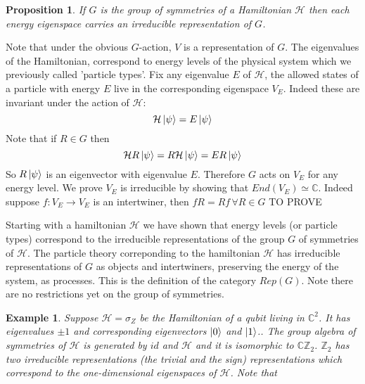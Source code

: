 \documentclass{article}
\newtheorem{example}{Example}
\newtheorem{proposition}[theorem]{Proposition}
\newenvironment{proof}[1][Proof]{\begin{trivlist}
\item[\hskip \labelsep {\bfseries #1}]}{\end{trivlist}}
\newcommand{\ham}{\mathcal{H}}
\begin{document}
\begin{proposition}
If $G$ is the group of symmetries of a Hamiltonian $\mathcal{H}$ then each energy eigenspace carries an irreducible representation of $G$.
\end{proposition}
\begin{proof}
Note that under the obvious $G$-action, $V$ is a representation of $G$. 
The eigenvalues of the Hamiltonian, correspond to energy levels of the physical system which we previously called 'particle types'. Fix any eigenvalue $E$ of $\ham$, the allowed states of a particle with energy $E$ live in the corresponding eigenspace $V_E$. Indeed these are invariant under the action of $\ham$:
$$ \ham \ket{\psi}= E\ket{\psi}$$
Note that if $R\in G$ then
$$ \ham R \ket{\psi}=R\ham \ket{\psi}=ER\ket{\psi}$$
So $R\ket{\psi}$ is an eigenvector with eigenvalue $E$. Therefore $G$ acts on $V_E$ for any energy level.
We prove $V_E$ is irreducible by showing that $End(V_E) \simeq \mathbb{C}$. Indeed suppose $f:V_E \rightarrow V_E$ is an intertwiner, then $fR=Rf \, \forall R \in G$
TO PROVE
\end{proof}
Starting with a hamiltonian $\ham$ we have shown that energy levels (or particle types) correspond to the irreducible representations of the group $G$ of symmetries of $\ham$. The particle theory correponding to the hamiltonian $\ham$ has irreducible representations of $G$ as objects and intertwiners, preserving the energy of the system, as processes. This is the definition of the category $Rep(G)$. Note there are no restrictions yet on the group of symmetries.
\begin{example}
Suppose $\ham = \sigma_Z$ be the Hamiltonian of a qubit living in $\mathbb{C}^2$. It has eigenvalues $\pm1$ and corresponding eigenvectors $\ket{0}$ and $\ket{1}$.. The group algebra of symmetries of $\ham$ is generated by $id$ and $\ham$ and it is isomorphic to $\mathbb{C}\mathbb{Z}_2$. $\mathbb{Z}_2$ has two irreducible representations (the trivial and the sign) representations which correspond to the one-dimensional eigenspaces of $\ham$. Note that 
\end{example}
\end{document}

